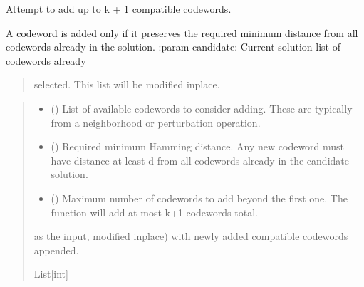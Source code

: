 \documentclass[letterpaper,10pt,english]{sphinxmanual}
\begin{document}
\begin{fulllineitems}
\label{\detokenize{index:hammindist.functions.try_add_codewords}}
\pysigstartsignatures
\pysiglinewithargsret
{}
{\sphinxparamcomma {}\sphinxparamcomma {}\sphinxparamcomma {}}
{}
\pysigstopsignatures
\sphinxAtStartPar
Attempt to add up to k + 1 compatible codewords.

\sphinxAtStartPar
A codeword is added only if it preserves the required
minimum distance from all codewords already in the solution.
:param candidate: Current solution list of codewords already
\begin{quote}

\sphinxAtStartPar
selected. This list will be modified in\sphinxhyphen{}place.
\end{quote}
\begin{quote}\begin{description}
\begin{itemize}
\item {} 
\sphinxAtStartPar
{} (\sphinxstyleliteralemphasis{\sphinxupquote{{[}}}\sphinxstyleliteralemphasis{\sphinxupquote{{]}}}) \textendash{} List of available codewords to consider adding.
These are typically from a neighborhood or
perturbation operation.

\item {} 
\sphinxAtStartPar
{} () \textendash{} Required minimum Hamming distance. Any new codeword must
have distance at least d from all codewords already in
the candidate solution.

\item {} 
\sphinxAtStartPar
{} () \textendash{} Maximum number of codewords to add beyond the first one.
The function will add at most k+1 codewords total.

\end{itemize}

\sphinxAtStartPar
\begin{description}
\sphinxAtStartPar
as the input, modified in\sphinxhyphen{}place) with newly added
compatible codewords appended.

\end{description}


\sphinxAtStartPar
List{[}int{]}

\end{description}\end{quote}

\end{fulllineitems}
\end{document}
